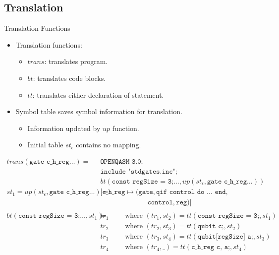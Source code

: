\subsection{Translation}
\begin{frame}{Translation Functions}
    \begin{itemize}
        \item Translation functions:
        \begin{itemize}
            \item $trans$: translates program.
            \item $bt$: translates code blocks.
            \item $tt$: translates either declaration of statement.
        \end{itemize}
        \item Symbol table saves symbol information for translation.
        \begin{itemize}
            \item Information updated by $up$ function.
            \item Initial table $st_\epsilon$ contains no mapping.
        \end{itemize}
    \end{itemize}
    \Large
    \begin{align*}
        trans(\texttt{gate c\_h\_reg} \dots) =& \ \texttt{OPENQASM 3.0;}\\
                                              & \ \texttt{include "stdgates.inc";}\\
                                              & \ bt(\texttt{const regSize = 3;} \dots, up(st_\epsilon, \texttt{gate c\_h\_reg} \dots))\\
        st_1 = up(st_\epsilon, \texttt{gate c\_h\_reg} \dots) =& \ 
        [ \texttt{c\_h\_reg} \mapsto (\texttt{gate}, \texttt{qif control do ... end}, \\
        & \quad\quad\quad\quad\quad\quad\quad \texttt{control}, \texttt{reg})  ]\\
        &\\
        bt(\texttt{const regSize = 3;} \dots, st_1) =& \ tr_1 \quad \quad \text{ where } (tr_1, st_2) = tt(\texttt{const regSize = 3;}, st_1)\\ 
                                                & \ tr_2 \quad \quad \text{ where } (tr_2, st_3) = tt(\texttt{qubit c;}, st_2)\\ 
                                                & \ tr_3 \quad \quad \text{ where } (tr_3, st_4) = tt(\texttt{qubit[regSize] a;}, st_3)\\ 
                                                & \ tr_4 \quad \quad \text{ where } (tr_4, \_) = tt(\texttt{c\_h\_reg c, a;}, st_4)
    \end{align*}
\end{frame}

